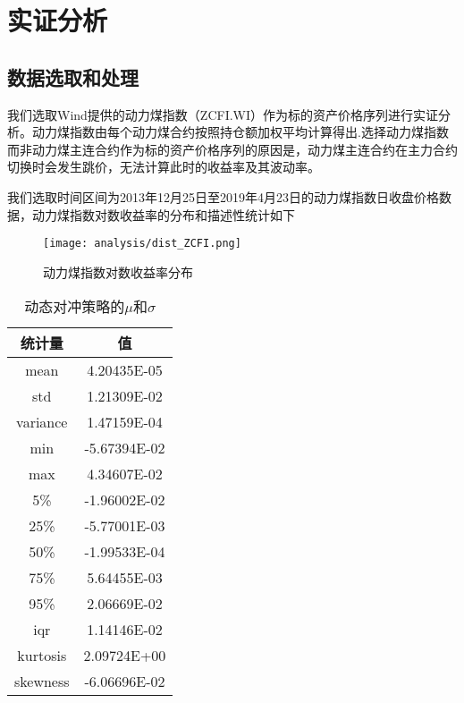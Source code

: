 
\chapter{实证分析}
\label{chap:analysis}

\section{数据选取和处理}

我们选取Wind提供的动力煤指数（ZCFI.WI）作为标的资产价格序列进行实证分析。动力煤指数由每个动力煤合约按照持仓额加权平均计算得出.选择动力煤指数而非动力煤主连合约作为标的资产价格序列的原因是，动力煤主连合约在主力合约切换时会发生跳价，无法计算此时的收益率及其波动率。

我们选取时间区间为2013年12月25日至2019年4月23日的动力煤指数日收盘价格数据，动力煤指数对数收益率的分布和描述性统计如下

\begin{figure}[htb]
  \centering
  \texttt{[image: analysis/dist\_ZCFI.png]}
  \caption[这里将出现在插图索引中]
    {动力煤指数对数收益率分布}
  \label{fig:ZCFI_describe}
\end{figure}

\begin{table}[htbp]
  \centering
  \caption{动态对冲策略的$\mu$和$\sigma$}
  \label{tab:ZCFI_describe}
  \begin{tabular}{cc}
    \toprule
    统计量 & 值 \\
    \midrule
    mean & 4.20435E-05 \\
    std & 1.21309E-02 \\
    variance & 1.47159E-04 \\
    min & -5.67394E-02 \\
    max & 4.34607E-02 \\
    5\% & -1.96002E-02 \\
    25\% & -5.77001E-03 \\
    50\% & -1.99533E-04 \\
    75\% & 5.64455E-03 \\
    95\% & 2.06669E-02 \\
    iqr & 1.14146E-02 \\
    kurtosis & 2.09724E+00 \\
    skewness & -6.06696E-02 \\
    \bottomrule
  \end{tabular}
\end{table}

